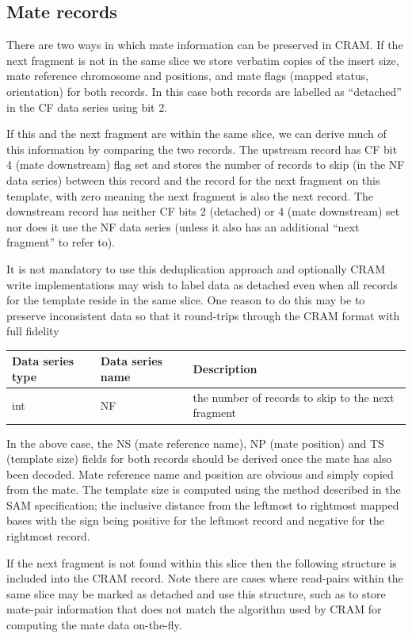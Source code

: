 \documentclass[a4paper]{article}
\begin{document}
\subsection{\textbf{Mate records}}
\label{subsec:mate}

There are two ways in which mate information can be preserved in CRAM.
If the next fragment is not in the same slice we store verbatim copies of the insert size, mate reference chromosome and positions, and mate flags (mapped status, orientation) for both records.
In this case both records are labelled as ``detached'' in the CF data series using bit 2.

If this and the next fragment are within the same slice, we can derive much of this information by comparing the two records.
The upstream record has CF bit 4 (mate downstream) flag set and stores the number of records to skip (in the NF data series) between this record and the record for the next fragment on this template, with zero meaning the next fragment is also the next record.
The downstream record has neither CF bits 2 (detached) or 4 (mate downstream) set nor does it use the NF data series (unless it also has an additional ``next fragment'' to refer to).

It is not mandatory to use this deduplication approach and optionally CRAM write implementations may wish to label data as detached even when all records for the template reside in the same slice.
One reason to do this may be to preserve inconsistent data so that it round-trips through the CRAM format with full fidelity

\begin{tabular}{|>{\raggedright}p{68pt}|>{\raggedright}p{115pt}|>{\raggedright}p{228pt}|}
\hline
\textbf{Data series type} & \textbf{Data series name} & \textbf{Description}\tabularnewline
\hline
int & NF & the number of records to skip to the next fragment\tabularnewline
\hline
\end{tabular}

In the above case, the NS (mate reference name), NP (mate position) and TS (template size) fields for both records should be derived once the mate has also been decoded.
Mate reference name and position are obvious and simply copied from the mate.
The template size is computed using the method described in the SAM specification; the inclusive distance from the leftmost to rightmost mapped bases with the sign being positive for the leftmost record and negative for the rightmost record.

If the next fragment is not found within this slice then the following structure is included into the CRAM record.
Note there are cases where read-pairs within the same slice may be marked as detached and use this structure, such as to store mate-pair information that does not match the algorithm used by CRAM for computing the mate data on-the-fly.
\end{document}
